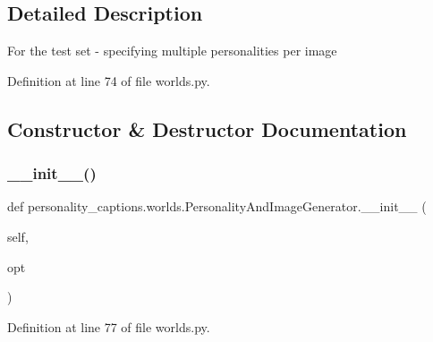 \subsection{Detailed Description}
\begin{DoxyVerb}For the test set - specifying multiple personalities per image\end{DoxyVerb}
 

Definition at line 74 of file worlds.\+py.



\subsection{Constructor \& Destructor Documentation}
\mbox{\label{classpersonality__captions_1_1worlds_1_1PersonalityAndImageGenerator_a2c0bf3982f19884f2ac82873c1b9f5ce}} 
\subsubsection{\texorpdfstring{\+\_\+\+\_\+init\+\_\+\+\_\+()}{\_\_init\_\_()}}
{\footnotesize\ttfamily def personality\+\_\+captions.\+worlds.\+Personality\+And\+Image\+Generator.\+\_\+\+\_\+init\+\_\+\+\_\+ (\begin{DoxyParamCaption}\item[{}]{self,  }\item[{}]{opt }\end{DoxyParamCaption})}



Definition at line 77 of file worlds.\+py.


